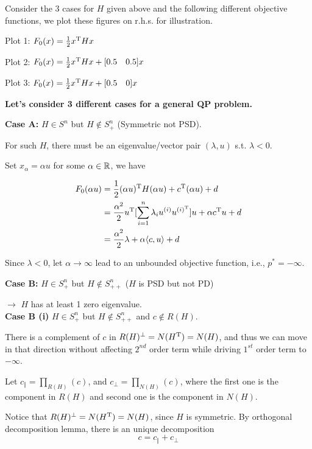 Consider the 3 cases for $H$ given above and the following different objective functions, we plot these figures on r.h.s. for illustration.

Plot 1: $F_0(x) =\frac{1}{2}x^{{\rm T}}Hx$

Plot 2: $F_0(x) =\frac{1}{2}x^{{\rm T}}Hx + [0.5\quad 0.5]x$

Plot 3: $F_0(x) =\frac{1}{2}x^{{\rm T}}Hx + [0.5\quad 0]x$


\vspace{0.5cm}
\textbf{Let's consider 3 different cases for a general QP problem.}

\textbf{Case A: } $H\in S^n$ but $H\notin S^n_+$ (Symmetric not PSD).

For such $H$, there must be an eigenvalue/vector pair $(\lambda, u)$ s.t. $\lambda < 0$.

Set $x_{\alpha} = \alpha u$ for some $\alpha \in \mathbb{R}$, we have

\begin{align*}
F_0(\alpha u) &= \frac{1}{2}(\alpha u)^{{\rm T}}H(\alpha u) + c^{{\rm T}}(\alpha u) + d\\
&= \frac{{\alpha}^2}{2} u^{{\rm T}}[\sum^n_{i=1}\lambda_i u^{(i)} u^{(i)^{{\rm T}}}]u + \alpha c^{{\rm T}}u + d\\
&= \frac{{\alpha}^2}{2}\lambda + \alpha \langle c,u\rangle + d
\end{align*}

Since $\lambda<0$, let $\alpha \to \infty$ lead to an unbounded objective function, i.e., $p^* = -\infty$.



\vspace{0.3cm}
\textbf{Case B: } $H\in S_+^n$ but $H\notin S^n_{++}$ ($H$ is PSD but not PD)

$\rightarrow$ $H$ has at least 1 zero eigenvalue.\\

\vspace{0.3cm}
\textbf{Case B (i)} $H\in S_+^n$ but $H\notin S^n_{++}$ and $c \notin R(H)$.

There is a complement of $c$ in $R(H)^{\perp} = N(H^{{\rm T}}) = N(H)$, and thus we can move in that direction without affecting $2^{nd}$ order term while driving $1^{st} $ order term to $-\infty$.

Let $c_{\Vert} = \prod_{R(H)}(c)$,  and $c_{\perp} = \prod_{N(H)}(c)$, where the first one is the component in $R(H)$ and second one is the component in $N(H)$.

Notice that $R(H)^{\perp}= N(H^{{\rm T}}) = N(H)$, since $H$ is symmetric. By orthogonal decomposition lemma, there is an unique decomposition
$$c = c_{\Vert} + c_{\perp}$$

